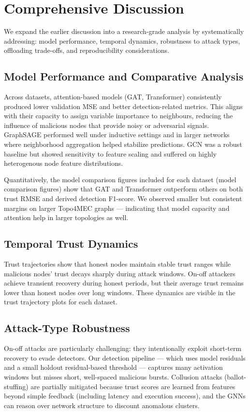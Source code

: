 \documentclass[12pt,a4paper]{article}
\begin{document}
\section{Comprehensive Discussion}
We expand the earlier discussion into a research-grade analysis by systematically addressing: model performance, temporal dynamics, robustness to attack types, offloading trade-offs, and reproducibility considerations.

\subsection{Model Performance and Comparative Analysis}
Across datasets, attention-based models (GAT, Transformer) consistently produced lower validation MSE and better detection-related metrics. This aligns with their capacity to assign variable importance to neighbours, reducing the influence of malicious nodes that provide noisy or adversarial signals. GraphSAGE performed well under inductive settings and in larger networks where neighborhood aggregation helped stabilize predictions. GCN was a robust baseline but showed sensitivity to feature scaling and suffered on highly heterogenous node feature distributions.

Quantitatively, the model comparison figures included for each dataset (model comparison figures) show that GAT and Transformer outperform others on both trust RMSE and derived detection F1-score. We observed smaller but consistent margins on larger Topo4MEC graphs — indicating that model capacity and attention help in larger topologies as well.

\subsection{Temporal Trust Dynamics}
Trust trajectories show that honest nodes maintain stable trust ranges while malicious nodes' trust decays sharply during attack windows. On-off attackers achieve transient recovery during honest periods, but their average trust remains lower than honest nodes over long windows. These dynamics are visible in the trust trajectory plots for each dataset.

\subsection{Attack-Type Robustness}
On-off attacks are particularly challenging: they intentionally exploit short-term recovery to evade detectors. Our detection pipeline — which uses model residuals and a small holdout residual-based threshold — captures many activation windows but misses short, well-spaced malicious bursts. Collusion attacks (ballot-stuffing) are partially mitigated because trust scores are learned from features beyond simple feedback (including latency and execution success), and the GNNs can reason over network structure to discount anomalous clusters.
\end{document}
